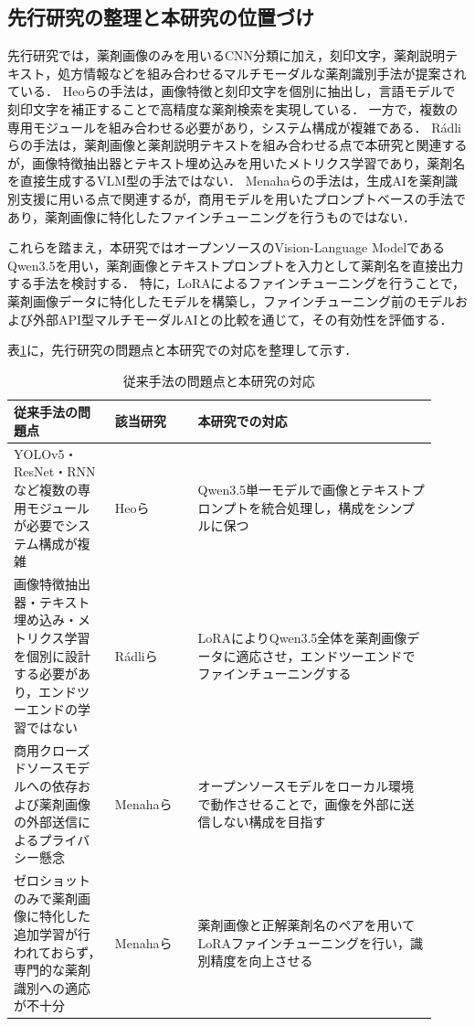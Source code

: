 \documentclass{jsarticle}
\begin{document}
\subsection{先行研究の整理と本研究の位置づけ}

先行研究では，薬剤画像のみを用いるCNN分類に加え，刻印文字，薬剤説明テキスト，処方情報などを組み合わせるマルチモーダルな薬剤識別手法が提案されている．
Heoらの手法は，画像特徴と刻印文字を個別に抽出し，言語モデルで刻印文字を補正することで高精度な薬剤検索を実現している．
一方で，複数の専用モジュールを組み合わせる必要があり，システム構成が複雑である．
Rádliらの手法は，薬剤画像と薬剤説明テキストを組み合わせる点で本研究と関連するが，画像特徴抽出器とテキスト埋め込みを用いたメトリクス学習であり，薬剤名を直接生成するVLM型の手法ではない．
Menahaらの手法は，生成AIを薬剤識別支援に用いる点で関連するが，商用モデルを用いたプロンプトベースの手法であり，薬剤画像に特化したファインチューニングを行うものではない．

これらを踏まえ，本研究ではオープンソースのVision-Language ModelであるQwen3.5を用い，薬剤画像とテキストプロンプトを入力として薬剤名を直接出力する手法を検討する．
特に，LoRAによるファインチューニングを行うことで，薬剤画像データに特化したモデルを構築し，ファインチューニング前のモデルおよび外部API型マルチモーダルAIとの比較を通じて，その有効性を評価する．

表\ref{tab:related}に，先行研究の問題点と本研究での対応を整理して示す．

\begin{table}[h]
\centering
\caption{従来手法の問題点と本研究の対応}
\label{tab:related}
\small
\setlength{\tabcolsep}{4pt}
\begin{tabular}{p{0.22\linewidth}p{0.18\linewidth}p{0.52\linewidth}}
\hline
従来手法の問題点 & 該当研究 & 本研究での対応 \\
\hline
YOLOv5・ResNet・RNNなど複数の専用モジュールが必要でシステム構成が複雑 &
Heoら \cite{heo2023pill} &
Qwen3.5単一モデルで画像とテキストプロンプトを統合処理し，構成をシンプルに保つ \\
\hline
画像特徴抽出器・テキスト埋め込み・メトリクス学習を個別に設計する必要があり，エンドツーエンドの学習ではない &
Rádliら \cite{radli2024metric} &
LoRAによりQwen3.5全体を薬剤画像データに適応させ，エンドツーエンドでファインチューニングする \\
\hline
商用クローズドソースモデルへの依存および薬剤画像の外部送信によるプライバシー懸念 &
Menahaら \cite{gemini2024pill} &
オープンソースモデルをローカル環境で動作させることで，画像を外部に送信しない構成を目指す \\
\hline
ゼロショットのみで薬剤画像に特化した追加学習が行われておらず，専門的な薬剤識別への適応が不十分 &
Menahaら \cite{gemini2024pill} &
薬剤画像と正解薬剤名のペアを用いてLoRAファインチューニングを行い，識別精度を向上させる \\
\hline
\end{tabular}
\end{table}
\end{document}

